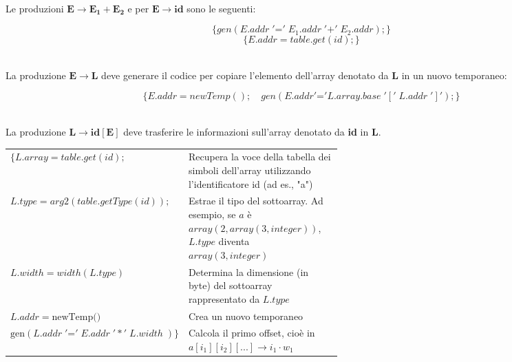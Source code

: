 \documentclass[11pt]{article}
\begin{document}
\noindent 
\\ Le produzioni $\mathbf{E\rightarrow E_1+E_2}$ e per $\mathbf{E\rightarrow id}$ sono le seguenti:
\begin{tcolorbox}[colframe=black!10!black, colback=black!10!white]
  $$\{gen(E.addr \;'\mathord{=}'\; E_1.addr \;'\mathord{+}'\; E_2.addr );\}$$
  $$\{E.addr = table.get(id);\}$$
\end{tcolorbox}
\noindent 
\\ La produzione $\mathbf{E\rightarrow L}$ deve generare il codice per copiare l'elemento dell'array 
denotato da \textbf{L} in un nuovo temporaneo:
\begin{tcolorbox}[colframe=black!10!black, colback=black!10!white]
  $$\{E.addr = newTemp();\quad gen(E.addr '\mathord{=}' L.array.base\;'['\;L.addr\;']');\}$$
\end{tcolorbox}
\noindent 
\\ La produzione $\mathbf{L \rightarrow id[E]}$ deve trasferire le informazioni sull'array denotato 
da \textbf{id} in \textbf{L}.
\begin{tcolorbox}[colframe=black!10!black, colback=black!10!white]
  \begin{center}
    \begin{tabularx}{\linewidth}{l m{0.56\linewidth}}
      $\{L.array = table.get(id);$ 
      & \footnotesize Recupera la voce della tabella dei simboli dell'array utilizzando l'identificatore id (ad es., "a") \\[0.3cm]
      
      $L.type = arg2(table.getType(id));$ 
      & \footnotesize Estrae il tipo del sottoarray. Ad esempio, se $a$ è $array(2, array(3, integer))$, $L.type$ diventa $array(3, integer)$ \\[0.3cm]
      
      $L.width = width(L.type)$ 
      & \footnotesize Determina la dimensione (in byte) del sottoarray rappresentato da $L.type$ \\[0.3cm]
      
      $L.addr = \text{newTemp()}$ 
      & \footnotesize Crea un nuovo temporaneo \\ [0.3cm]
      
      $\text{gen}(L.addr \;'\mathord{=}'\;E.addr \;'*'\; L.width\; )\}$ 
      & \footnotesize Calcola il primo offset, cioè in $a[i_1][i_2][...] \rightarrow i_1 \cdot w_1$ \\
    \end{tabularx}
  \end{center}
\end{tcolorbox}
\end{document}
